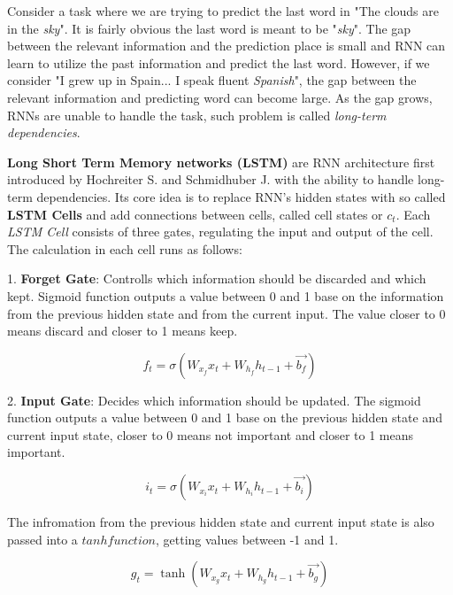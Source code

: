 
Consider a task where we are trying to predict the last word in "The clouds are in the \textit{sky}". It is fairly obvious the last word is meant to be "\textit{sky}". The gap between the relevant information and the prediction place is small and RNN can learn to utilize the past information and predict the last word. However, if we consider "I grew up in Spain... I speak fluent \textit{Spanish}", the gap between the relevant information and predicting word can become large. As the gap grows, RNNs are unable to handle the task, such problem is called \textit{long-term dependencies}.\cite{colahLSTM}

\textbf{Long Short Term Memory networks (LSTM)} are RNN architecture first introduced by Hochreiter S. and Schmidhuber J. \cite{hochreiterLSTM} with the ability to handle long-term dependencies. Its core idea is to replace RNN's hidden states with so called \textbf{LSTM Cells} and add connections between cells, called cell states or $c_{t}$. Each \textit{LSTM Cell} consists of three gates, regulating the input and output of the cell. The calculation in each cell runs as follows:

1. \textbf{Forget Gate}: Controlls which information should be discarded and which kept. Sigmoid function outputs a value between 0 and 1 base on the information from the previous hidden state and from the current input. The value closer to 0 means discard and closer to 1 means keep.

\begin{equation}
    {f_t = \sigma(W_{x_f}x_t + W_{h_f}h_{t-1}+\vec{b_f})}
\end{equation}

2. \textbf{Input Gate}: Decides which information should be updated. The sigmoid function outputs a value between 0 and 1 base on the previous hidden state and current input state, closer to 0 means not important and closer to 1 means important.

\begin{equation}
    {i_t = \sigma(W_{x_i}x_t + W_{h_i}h_{t-1}+\vec{b_i})}
\end{equation}

The infromation from the previous hidden state and current input state is also passed into a $tanh function$, getting values between -1 and 1.

\begin{equation}
    {g_t = \tanh(W_{x_g}x_t + W_{h_g}h_{t-1}+\vec{b_g})}
\end{equation}

